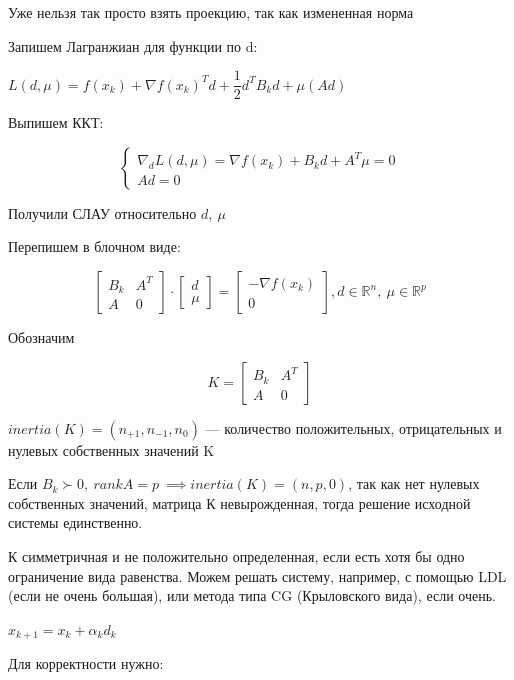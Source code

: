 Уже нельзя так просто взять проекцию, так как измененная норма

\bigskip

Запишем Лагранжиан для функции по d:


$L(d, \mu) =  f(x_k) + \nabla f(x_k)^Td + \dfrac{1}{2} d^TB_k d + \mu (Ad)$


Выпишем ККТ:

\[
\begin{cases}
\nabla_{d} L(d, \mu) = \nabla f(x_k) + B_kd + A^T\mu = 0 \\
Ad = 0
\end{cases}
\]

Получили СЛАУ относительно $d, \ \mu$

Перепишем в блочном виде:

\[
\begin{bmatrix}
B_k & A^T \\
A & 0
\end{bmatrix}
 \cdot
  \begin{bmatrix}
  d \\
  \mu
 \end{bmatrix} =
  \begin{bmatrix}
-\nabla f(x_k) \\
0
\end{bmatrix} ,
d \in \mathbb{R}^n, \ \mu \in \mathbb{R}^p
\]

Обозначим

\[
K =
\begin{bmatrix}
	B_k & A^T \\
	A & 0
\end{bmatrix}
\]

$inertia(K) = (n_{+1}, n_{-1}, n_0)$ —  количество положительных, отрицательных и нулевых собственных значений K

\bigskip

Если $B_k \succ 0, \ rank A = p \ \implies inertia(K) = (n, p ,0)$, так как нет нулевых собственных значений, матрица К невырожденная, тогда решение исходной системы единственно.

К симметричная и не положительно определенная, если есть хотя бы одно ограничение вида равенства. Можем решать систему, например, с помощью LDL (если не очень большая), или метода типа CG (Крыловского вида), если очень.

\bigskip

$x_{k+1} = x_k + \alpha_k d_k$

\medskip

Для корректности нужно:

